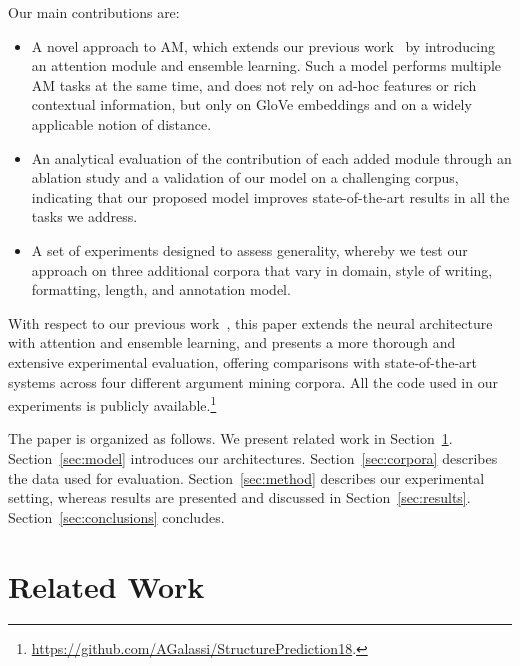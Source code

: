 \documentclass[journal]{IEEEtran}
\begin{document}
Our main contributions are:
\begin{itemize}
    \item A novel approach to AM, which extends our previous work~\cite{W18-5201} by introducing an attention module and ensemble learning. Such a model performs multiple AM tasks at the same time, and does not rely on ad-hoc features or rich contextual information, but only on GloVe embeddings and on a widely applicable notion of distance.
    \item An analytical evaluation of the contribution of each added module through an ablation study and a validation of our model on a challenging corpus, indicating that our proposed model improves state-of-the-art results in all the tasks we address.
    \item A set of experiments designed to assess generality, whereby we test our approach on three additional corpora that vary in domain, style of writing, formatting, length, and annotation model.
\end{itemize}

With respect to our previous work~\cite{W18-5201}, this paper extends the neural architecture with attention and ensemble learning, and presents a more thorough and extensive experimental evaluation, offering comparisons with state-of-the-art systems across four different argument mining corpora.
All the code used in our experiments is publicly available.\footnote{\url{https://github.com/AGalassi/StructurePrediction18}.}

The paper is organized as follows. We present related work in Section~\ref{sec:related}.
Section~\ref{sec:model} introduces our architectures.
Section~\ref{sec:corpora} describes the data used for evaluation. Section~\ref{sec:method} describes our experimental setting, whereas results are presented and discussed in Section~\ref{sec:results}. Section~\ref{sec:conclusions} concludes.
 
\section{Related Work}
\label{sec:related}
\end{document}
